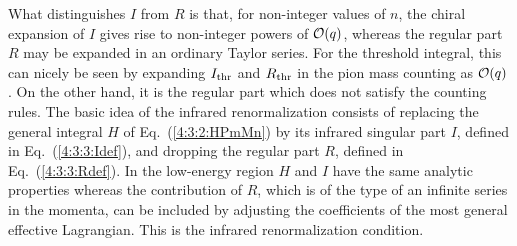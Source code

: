 \documentclass[twoside,12pt]{article}
\begin{document}
   What distinguishes $I$ from $R$ is that, for non-integer values of
$n$, the chiral expansion of $I$ gives rise to non-integer powers of
${\cal O}(q)$, whereas the regular part $R$ may be
expanded in an ordinary Taylor series.
   For the threshold integral, this can nicely be seen by expanding
$I_{\rm thr}$ and $R_{\rm thr}$ in the pion mass counting as
${\cal O}(q)$.
   On the other hand, it is the regular part which does not satisfy
the counting rules.
    The basic idea of the infrared renormalization consists of replacing
the general integral $H$ of Eq.\ (\ref{4:3:2:HPmMn})
by its infrared singular part $I$, defined in Eq.\ (\ref{4:3:3:Idef}),
and dropping the regular part $R$, defined in Eq.\ (\ref{4:3:3:Rdef}).
   In the low-energy region $H$ and $I$ have the same analytic properties
whereas the contribution of $R$, which is of the type of an infinite
series in the momenta, can be included by adjusting the coefficients of
the most general effective Lagrangian.
   This is the infrared renormalization condition.
\end{document}
